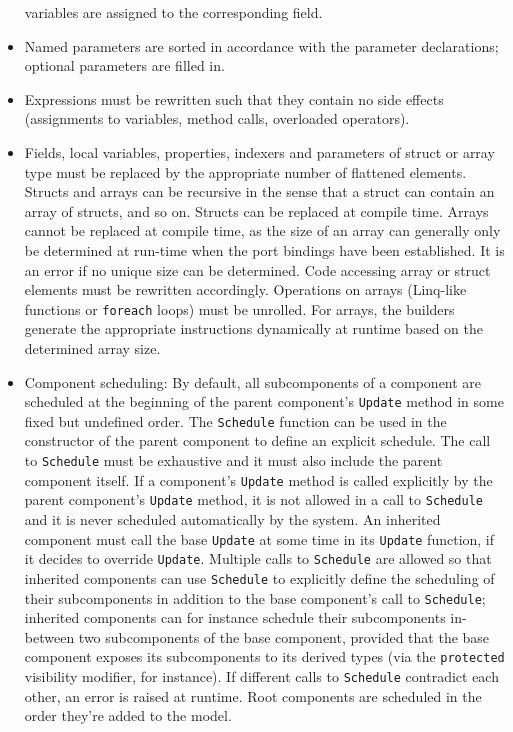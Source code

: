 \documentclass[a4paper,10pt,english]{article}
\begin{document}
\begin{itemize}
	variables are assigned to the corresponding field.
	\item Named parameters are sorted in accordance with the parameter declarations; optional parameters are filled in.
	\item Expressions must be rewritten such that they contain no side effects (assignments to variables, method calls, overloaded
	operators).
	\item Fields, local variables, properties, indexers and parameters of struct or array type must be replaced by the appropriate
	number of flattened elements. Structs and arrays can be recursive in the sense that a struct can contain an array of structs,
	and so on. Structs can be replaced at compile time. Arrays cannot be replaced at compile time, as the size of an array can
	generally only be determined at run-time when the port bindings have been established. It is an error if no unique size can be
	determined. Code accessing array or struct elements must be rewritten accordingly. Operations on arrays (Linq-like functions or
	\texttt{foreach} loops) must be unrolled. For arrays, the builders generate the appropriate instructions dynamically at runtime
	based on the determined array size.
	\item Component scheduling: By default, all subcomponents of a component are scheduled at the beginning of the parent component's
	\texttt{Update} method in some fixed but undefined order. The \texttt{Schedule} function can be used in the
	constructor of the parent component to define an explicit schedule.
	The call to \texttt{Schedule} must be exhaustive and it must also include the parent component itself. 
	If a component's \texttt{Update} method is called explicitly by the parent component's \texttt{Update} method, it is not allowed in a call to \texttt{Schedule} and it is never
	scheduled automatically by the system.
	An inherited component must call the base \texttt{Update} at some time in its \texttt{Update} function, if it decides to override
	\texttt{Update}. Multiple calls to \texttt{Schedule} are allowed so that inherited components can use \texttt{Schedule} to
	explicitly define the scheduling of their subcomponents in addition to the base component's call to \texttt{Schedule}; inherited
	components can for instance schedule their subcomponents in-between two subcomponents of the base component, provided that the
	base component exposes its subcomponents to its derived types (via the \texttt{protected} visibility modifier, for instance). If
	different calls to \texttt{Schedule} contradict each other, an error is raised at runtime. Root components are scheduled in the
	order they're added to the model.
\end{itemize}
\end{document}
